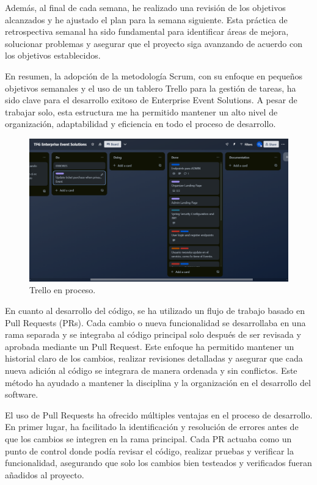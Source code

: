 Además, al final de cada semana, he realizado una revisión de los objetivos alcanzados y he ajustado el plan para la semana siguiente. Esta práctica 
de retrospectiva semanal ha sido fundamental para identificar áreas de mejora, solucionar problemas y asegurar que el proyecto siga avanzando de acuerdo 
con los objetivos establecidos.

En resumen, la adopción de la metodología Scrum, con su enfoque en pequeños objetivos semanales y el uso de un tablero Trello para la gestión de 
tareas, ha sido clave para el desarrollo exitoso de Enterprise Event Solutions. A pesar de trabajar solo, esta estructura me ha permitido mantener 
un alto nivel de organización, adaptabilidad y eficiencia en todo el proceso de desarrollo.


\begin{figure}[h]
    \includegraphics[width=\linewidth]{Trello.png}
    \caption{Trello en proceso.}
    \label{fig:metodologias1}
\end{figure}

En cuanto al desarrollo del código, se ha utilizado un flujo de trabajo basado en Pull Requests (PRs). Cada cambio o nueva 
funcionalidad se desarrollaba en una rama separada y se integraba al código principal solo después de ser revisada y aprobada 
mediante un Pull Request. Este enfoque ha permitido mantener un historial claro de los cambios, realizar revisiones detalladas y 
asegurar que cada nueva adición al código se integrara de manera ordenada y sin conflictos. Este método ha ayudado a mantener la disciplina y la organización en el
 desarrollo del software.

El uso de Pull Requests ha ofrecido múltiples ventajas en el proceso de desarrollo. En primer lugar, ha facilitado la identificación y 
resolución de errores antes de que los cambios se integren en la rama principal. Cada PR actuaba como un punto de control donde podía revisar 
el código, realizar pruebas y verificar la funcionalidad, asegurando que solo los cambios bien testeados y verificados fueran añadidos al proyecto.


